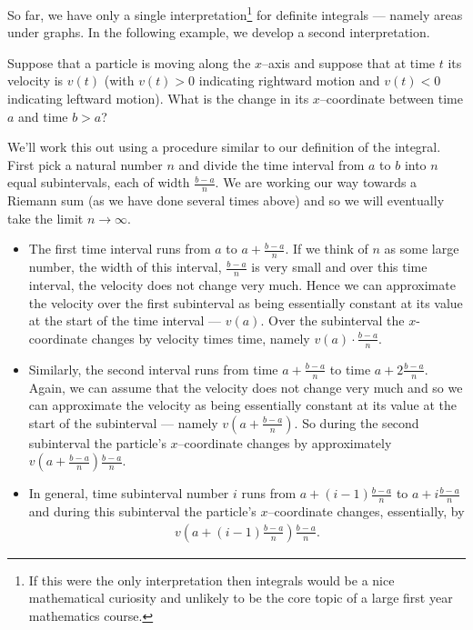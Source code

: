 So far, we have only a single interpretation\footnote{If this were the only
interpretation
then integrals would be a nice mathematical curiosity and unlikely to be the
core
topic of a large first year mathematics course.} for definite integrals ---
namely areas
under graphs. In the following example, we develop a second interpretation.
\begin{eg}\label{eg:INTdistance}
Suppose that a particle is moving along the $x$--axis
and suppose that at time $t$ its velocity is $v(t)$ (with $v(t)>0$
indicating rightward motion and $v(t)<0$ indicating leftward motion).
What is the change in its $x$--coordinate between time $a$ and time $b>a$?

We'll work this out using a procedure similar to our definition of the
integral. First pick a natural number $n$ and divide the time interval from $a$
to $b$ into $n$ equal subintervals, each of width $\frac{b-a}{n}$. We are
working our way
towards a Riemann sum (as we have done several times above) and so we will
eventually
take the limit $n\rightarrow\infty$.
\begin{itemize}
\item The first time interval runs from $a$ to $a+\frac{b-a}{n}$. If we think of
$n$ as
some large number, the width of this interval, $\frac{b-a}{n}$ is very small and
over
this time interval, the velocity does not change very much. Hence we can
approximate the
velocity over the first subinterval as being essentially constant at its value
at the
start of the time interval --- $v(a)$. Over the subinterval the $x$-coordinate
changes by
velocity times time, namely $v(a) \cdot \frac{b-a}{n}$.

\item Similarly, the second  interval runs from time $a+\frac{b-a}{n}$
to time $a+2\frac{b-a}{n}$. Again, we can assume that the velocity does not
change
very much and so we can approximate the velocity as being essentially constant
at its
value at the start of the subinterval --- namely
$v\left(a+\frac{b-a}{n}\right)$. So
during the second subinterval the particle's
$x$--coordinate changes by approximately $v\left(a+\frac{b-a}{n}\right)
\frac{b-a}{n}$.
\item In general, time subinterval number $i$ runs from $a+(i-1)\frac{b-a}{n}$
to $a+i\frac{b-a}{n}$ and during this subinterval the particle's $x$--coordinate
changes, essentially, by
\begin{align*}
v\left(a+(i-1)\frac{b-a}{n}\right)  \frac{b-a}{n}.
\end{align*}


\end{itemize}
\end{eg}
